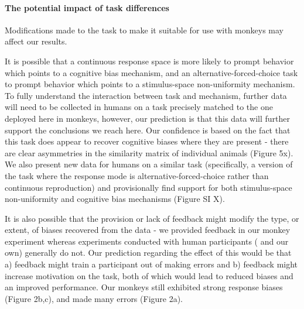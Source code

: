 \documentclass[9pt,biorxiv,lineno,onehalfspacing]{lapreprint}
\begin{document}
\begin{refsection}
\paragraph{The potential impact of task differences}

Modifications made to the task to make it suitable for use with monkeys may affect our results.

It is possible that a continuous response space is more likely to prompt behavior which points to a cognitive bias mechanism, and an alternative-forced-choice task to prompt behavior which points to a stimulus-space non-uniformity mechanism.
To fully understand the interaction between task and mechanism, further data will need to be collected in humans on a task precisely matched to the one deployed here in monkeys, however, our prediction is that this data will further support the conclusions we reach here.
Our confidence is based on the fact that this task does appear to recover cognitive biases where they are present - there are clear asymmetries in the similarity matrix of individual animals (Figure 5x).
We also present new data for humans on a similar task (specifically, a version of the task where the response mode is alternative-forced-choice rather than continuous reproduction) and provisionally find support for both stimulus-space non-uniformity and cognitive bias mechanisms (Figure SI X).

It is also possible that the provision or lack of feedback might modify the type, or extent, of biases recovered from the data - we provided feedback in our monkey experiment whereas experiments conducted with human participants (\citep{bae_why_2015,panichello_error-correcting_2019} and our own) generally do not.
Our prediction regarding the effect of this would be that a) feedback might train a participant out of making errors and b) feedback might increase motivation on the task, both of which would lead to reduced biases and an improved performance.
Our monkeys still exhibited strong response biases (Figure 2b,c), and made many errors (Figure 2a).


\end{refsection}
\end{document}

